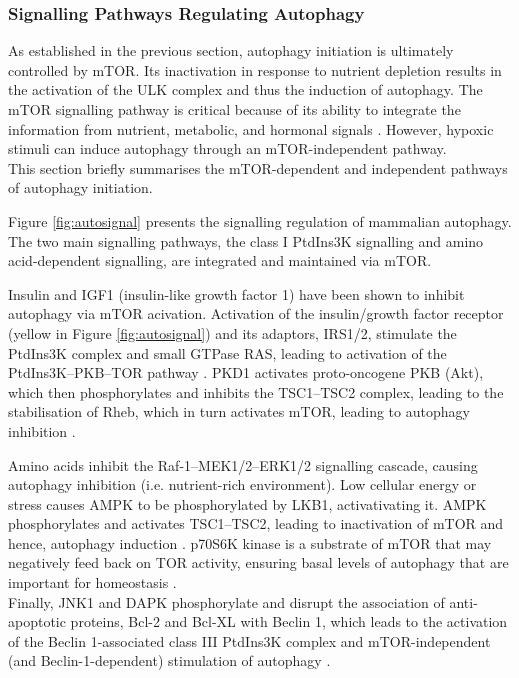            
            
            
            


    
    \subsubsection{Signalling Pathways Regulating Autophagy}

    As established in the previous section, autophagy initiation is ultimately controlled by mTOR. Its inactivation in response to nutrient depletion results in the activation of the ULK complex and thus the induction of autophagy. The mTOR signalling pathway is critical because of its ability to integrate the information from nutrient, metabolic, and hormonal signals \cite{lamb2013}.  However, hypoxic stimuli can induce autophagy through an mTOR-independent pathway.\\ 
    This section briefly summarises the mTOR-dependent and independent pathways of autophagy initiation. 
    
    
    \newpage
    Figure \ref{fig:autosignal} presents the signalling regulation of mammalian autophagy. The two main signalling pathways, the class I PtdIns3K signalling and amino acid-dependent signalling, are integrated and maintained via mTOR. 
    
    Insulin and IGF1 (insulin-like growth factor 1) have been shown to inhibit autophagy via mTOR acivation. Activation of the insulin/growth factor receptor (yellow in Figure \ref{fig:autosignal}) and its adaptors, IRS1/2, stimulate the PtdIns3K complex and small GTPase RAS, leading to activation of the PtdIns3K–PKB–TOR pathway \cite{Yang2010}. PKD1 activates proto-oncogene PKB (Akt), which then phosphorylates and inhibits the TSC1–TSC2 complex, leading to the stabilisation of Rheb, which in turn activates mTOR, leading to autophagy inhibition \cite{meijer2004regulation,Yang2010a}.
    
     Amino acids inhibit the Raf-1–MEK1/2–ERK1/2 signalling cascade, causing autophagy inhibition (i.e. nutrient-rich environment). Low cellular energy or stress causes AMPK to be phosphorylated by LKB1, activativating it. AMPK phosphorylates and activates TSC1–TSC2, leading to inactivation of mTOR and hence, autophagy induction \cite{Kroemer2010}. p70S6K kinase is a substrate of mTOR that may negatively feed back on TOR activity, ensuring basal levels of autophagy that are important for homeostasis \cite{Yang2010a}. \\
     Finally, JNK1 and DAPK phosphorylate and disrupt the association of anti-apoptotic proteins, Bcl-2 and Bcl-XL with Beclin 1, which leads to the activation of the Beclin 1-associated class III PtdIns3K complex and mTOR-independent (and Beclin-1-dependent) stimulation of autophagy \cite{wei2008jnk1}. \\
    
